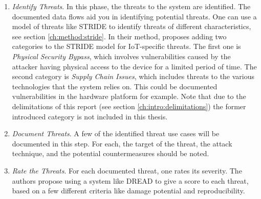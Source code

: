 \begin{enumerate}
    \item \textit{Identify Threats}. In this phase, the threats to the system are identified. The documented data flows aid you in identifying potential threats. One can use a model of threats like STRIDE \cite{stride} to identify threats of different characteristics, see section \ref{ch:method:stride}. In their method, \citeauthor{guzman2017iot} proposes adding two categories to the STRIDE model for IoT-specific threats. The first one is \textit{Physical Security Bypass}, which involves vulnerabilities caused by the attacker having physical access to the device for a limited period of time. The second category is \textit{Supply Chain Issues}, which includes threats to the various technologies that the system relies on. This could be documented vulnerabilities in the hardware platform for example. Note that due to the delimitations of this report (see section \ref{ch:intro:delimitations}) the former introduced category is not included in this thesis.
    \item \textit{Document Threats}. A few of the identified threat use cases will be documented in this step. For each, the target of the threat, the attack technique, and the potential countermeasures should be noted.
    \item \textit{Rate the Threats}. For each documented threat, one rates its severity. The authors propose using a system like DREAD to give a score to each threat, based on a few different criteria like damage potential and reproducibility.
\end{enumerate}

